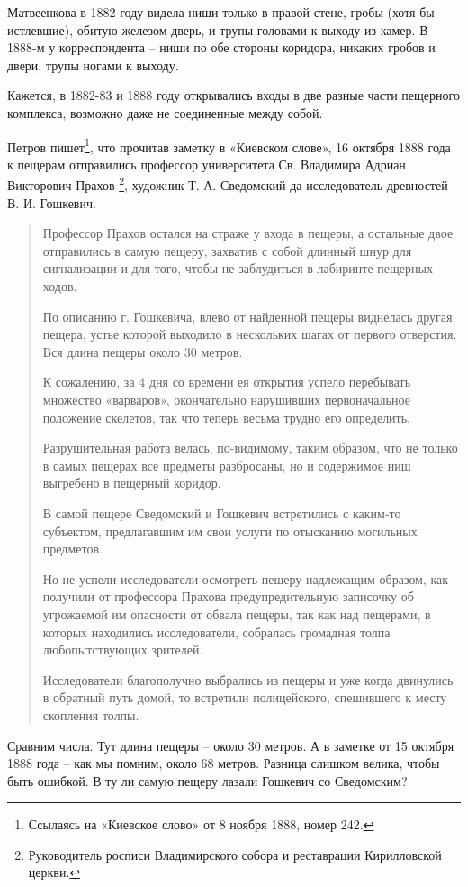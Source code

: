 Матвеенкова в 1882 году видела ниши только в правой стене, гробы (хотя бы истлевшие), обитую железом дверь, и трупы головами к выходу из камер. В 1888-м у корреспондента – ниши по обе стороны коридора, никаких гробов и двери, трупы ногами к выходу.

Кажется, в 1882-83 и 1888 году открывались входы в две разные части пещерного комплекса, возможно даже не соединенные между собой.

Петров пишет\footnote{Ссылаясь на «Киевское слово» от 8 ноября 1888, номер 242.}, что прочитав заметку в «Киевском слове», 16 октября 1888 года к пещерам отправились профессор университета Св. Владимира Адриан Викторович Прахов
\footnote{Руководитель росписи Владимирского собора и реставрации Кирилловской церкви.}, художник Т. А. Сведомский да исследователь древностей В. И. Гошкевич.

\begin{quotation}
Профессор Прахов остался на страже у входа в пещеры, а остальные двое отправились в самую пещеру, захватив с собой длинный шнур для сигнализации и для того, чтобы не заблудиться в лабиринте пещерных ходов.

По описанию г. Гошкевича, влево от найденной пещеры виднелась другая пещера, устье которой выходило в нескольких шагах от первого отверстия. Вся длина пещеры около 30 метров. 

К сожалению, за 4 дня со времени ея открытия успело перебывать множество «варваров», окончательно нарушивших первоначальное положение скелетов, так что теперь весьма трудно его определить.

Разрушительная работа велась, по-видимому, таким образом, что не только в самых пещерах все предметы разбросаны, но и содержимое ниш выгребено в пещерный коридор.

В самой пещере Сведомский и Гошкевич встретились с каким-то субъектом, предлагавшим им свои услуги по отысканию могильных предметов.

Но не успели исследователи осмотреть пещеру надлежащим образом, как получили от профессора Прахова предупредительную записочку об угрожаемой им опасности от обвала пещеры, так как над пещерами, в которых находились исследователи, собралась громадная толпа любопытствующих зрителей.

Исследователи благополучно выбрались из пещеры и уже когда двинулись в обратный путь домой, то встретили полицейского, спешившего к месту скопления толпы.
\end{quotation}

Сравним числа. Тут длина пещеры – около 30 метров. А в заметке от 15 октября 1888 года – как мы помним, около 68 метров. Разница слишком велика, чтобы быть ошибкой. В ту ли самую пещеру лазали Гошкевич со Сведомским?

